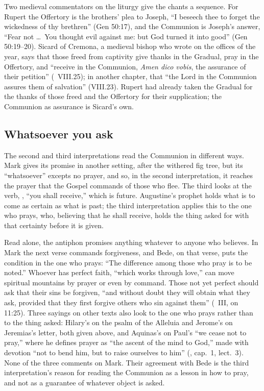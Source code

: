 Two medieval commentators on the liturgy give the chants a sequence. For
Rupert the Offertory is the brothers' plea to Joseph, ``I beseech thee to
forget the wickedness of thy brethren'' (Gen 50:17), and the Communion is
Joseph's answer, ``Fear not \dots\ You thought evil against me: but God turned
it into good'' (Gen 50:19--20). Sicard of Cremona, a medieval bishop who wrote
on the offices of the year, says that those freed from captivity give thanks
in the Gradual, pray in the Offertory, and ``receive in the Communion,
\emph{Amen dico vobis}, the assurance of their petition'' (~VIII.25);
in another chapter, that ``the Lord in the Communion assures them of
salvation'' (VIII.23). Rupert had already taken the Gradual for the thanks of
those freed and the Offertory for their supplication; the Communion as
assurance is Sicard's own.

\subsection{Whatsoever you ask}

The second and third interpretations read the Communion in different ways.
Mark gives its promise in another setting, after the withered fig tree, but
its ``whatsoever'' excepts no prayer, and so, in the second interpretation,
it reaches the prayer that the Gospel commands of those
who flee. The third looks at the verb, , ``you shall
receive,'' which is future. Augustine's prophet holds what is to come as
certain as what is past; the third interpretation applies this to the one who
prays, who, believing that he shall receive, holds the thing asked for with
that certainty before it is given.

Read alone, the antiphon promises anything whatever to anyone who believes.
In Mark the next verse commands forgiveness, and Bede, on that verse, puts the
condition in the one who prays: ``The difference among those who pray is to
be noted.'' Whoever has perfect faith, ``which works through love,'' can move
spiritual mountains by prayer or even by command. Those not yet perfect should
ask that their sins be forgiven, ``and without doubt they will obtain what
they ask, provided that they first forgive others who sin against them''
(~III, on 11:25). Three sayings on other
texts also look to the one who prays rather than to the thing asked: Hilary's
on the psalm of the Alleluia and Jerome's on Jeremias's letter, both given
above, and Aquinas's on Paul's ``we cease not to pray,'' where he defines
prayer as ``the ascent of the mind to God,'' made with devotion ``not
to bend him, but to raise ourselves to him'' (,
cap.~1, lect.~3). None of the three comments on Mark. Their agreement with
Bede is the third interpretation's reason for reading the Communion as a
lesson in how to pray, and not as a guarantee of whatever object is asked.

